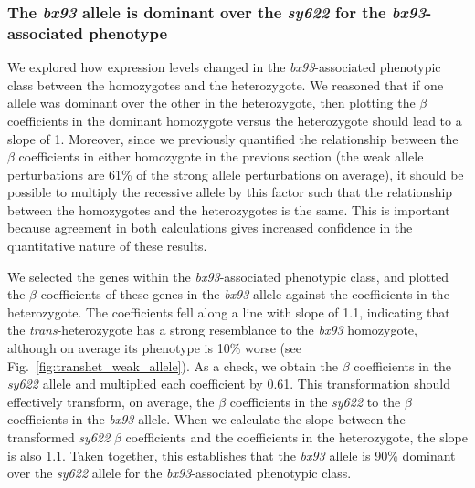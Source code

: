 \documentclass[10pt, onecolumn]{article}
\begin{document}
\subsubsection*{The \emph{bx93} allele is dominant over the \emph{sy622} for the
             \emph{bx93}-associated phenotype}

We explored how expression levels changed in the \emph{bx93}-associated
phenotypic class between the homozygotes and the heterozygote.
We reasoned that if one allele was dominant over the other in the heterozygote,
then plotting the $\beta$ coefficients in the dominant homozygote versus the
heterozygote should lead to a slope of 1. Moreover, since we previously
quantified the relationship between the $\beta$ coefficients in either
homozygote in the previous section (the weak allele perturbations are 61\% of
the strong allele perturbations on average), it should be possible to multiply
the recessive allele by this factor such that the relationship between the
homozygotes and the heterozygotes is the same. This is important because
agreement in both calculations gives increased confidence in the quantitative
nature of these results.

We selected the genes within the \emph{bx93}-associated phenotypic class, and
plotted the $\beta$ coefficients of these genes in the \emph{bx93} allele
against the coefficients in the heterozygote. The coefficients fell
along a line with slope of 1.1, indicating that the \emph{trans}-heterozygote
has a strong resemblance to the \emph{bx93} homozygote, although on average its
phenotype is 10\% worse (see Fig.~\ref{fig:transhet_weak_allele}). As a check,
we obtain the $\beta$ coefficients in the \emph{sy622} allele and multiplied
each coefficient by 0.61. This transformation should effectively transform, on
average, the $\beta$ coefficients in the \emph{sy622} to the $\beta$
coefficients in the \emph{bx93} allele. When we calculate the slope between the
transformed \emph{sy622} $\beta$ coefficients and the coefficients in the
heterozygote, the slope is also 1.1. Taken together, this establishes that the
\emph{bx93} allele is 90\% dominant over the \emph{sy622} allele for the
\emph{bx93}-associated phenotypic class.
\end{document}
